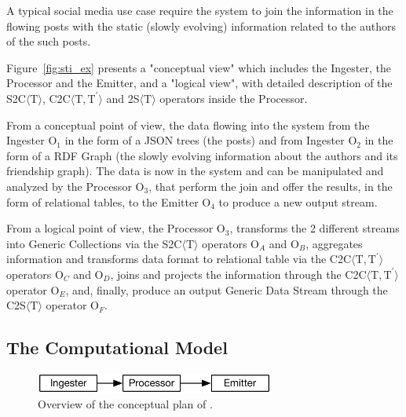 {A typical social media use case require the system to join the information in the flowing posts with the static (slowly evolving) information related to the authors of the such posts.

Figure~\ref{fig:sti_ex} presents a "conceptual view" which includes the \textsf{Ingester}, the \textsf{Processor} and the \textsf{Emitter}, and a "logical view", with detailed description of the S2C$\langle\mathrm{T}\rangle$, C2C$\langle\mathrm{T},\mathrm{T^{\prime}}\rangle$ and 2S$\langle\mathrm{T}\rangle$ operators inside the \textsf{Processor}.

From a conceptual point of view, the data flowing into the system from the \textsf{Ingester} O$_1$ in the form of a JSON trees (the posts) and from \textsf{Ingester} O$_2$ in the form of a RDF Graph (the slowly evolving information about the authors and its friendship graph). The data is now in the system and can be manipulated and analyzed by the \textsf{Processor} O$_3$, that perform the join and offer the results, in the form of relational tables, to the \textsf{Emitter} O$_4$ to produce a new output stream.

From a logical point of view, the \textsf{Processor} O$_3$, transforms the 2 different streams into Generic Collections via the S2C$\langle\mathrm{T}\rangle$ operators O$_A$ and O$_B$, aggregates information and transforms data format to relational table via the C2C$\langle\mathrm{T},\mathrm{T^{\prime}}\rangle$ operators O$_C$ and O$_D$, joins and projects the information through the C2C$\langle\mathrm{T},\mathrm{T^{\prime}}\rangle$ operator O$_E$, and, finally, produce an output Generic Data Stream through the C2S$\langle\mathrm{T}\rangle$ operator O$_F$.

\subsection{The Computational Model}\label{sec:comp-mod-sol-river}

\begin{figure}[t]
\centering
\includegraphics[width=0.7\textwidth]{img/computational-model-conceptual}
\caption{Overview of the conceptual plan of \textnormal{\protect\river{}}.}
\label{fig:cm-c}
\end{figure} 

}
